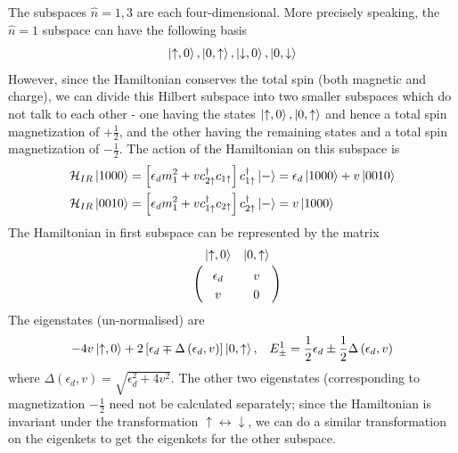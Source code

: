 \documentclass[12pt,twoside]{report}
\numberwithin{equation}{section}
\begin{document}
\pb The subspaces \(\hat n = 1,3\) are each four-dimensional. More precisely speaking, the \(\hat n=1\) subspace can have the following basis
\begin{equation}\begin{aligned}
	\ket{\uparrow,0}, \ket{0,\uparrow}, \ket{\downarrow,0}, \ket{0,\downarrow}
\end{aligned}\end{equation}
However, since the Hamiltonian conserves the total spin (both magnetic and charge), we can divide this Hilbert subspace into two smaller subspaces which do not talk to each other - one having the states \(\ket{\uparrow,0}, \ket{0,\uparrow}\) and hence a total spin magnetization of \(+\frac{1}{2}\), and the other having the remaining states and a total spin magnetization of \(-\frac{1}{2}\). The action of the Hamiltonian on this subspace is
\begin{equation}\begin{aligned}
	\mathcal{H}_{IR} \ket{1000} &= \left[\epsilon_d m_1^2 + vc^\dagger_{2 \uparrow}c_{1 \uparrow}\right] c^\dagger_{1 \uparrow}\ket{-} = \epsilon_d\ket{1000} + v\ket{0010}\\
	\mathcal{H}_{IR} \ket{0010} &= \left[\epsilon_d m_1^2 + vc^\dagger_{1 \uparrow}c_{2 \uparrow}\right] c^\dagger_{2 \uparrow}\ket{-} = v\ket{1000}\\
\end{aligned}\end{equation}
The Hamiltonian in first subspace can be represented by the matrix
\begin{equation}\begin{aligned}
	\label{n1mat}
	\bordermatrix{~&\ket{\uparrow,0} & \ket{0,\uparrow} \\
		~&\epsilon_d & v \\
		~& v & 0 \\
	}
\end{aligned}\end{equation}
The eigenstates (un-normalised) are
\begin{equation}\begin{aligned}
\label{low}
	-4v\ket{\uparrow,0} +2 \left[ \epsilon_d \mp \Delta\left(\epsilon_d , v\right)\right] \ket{0, \uparrow}, && E^1_\pm = \frac{1}{2} \epsilon_d \pm \frac{1}{2}\Delta\left(\epsilon_d , v\right)
\end{aligned}\end{equation}
where \(\Delta\left(\epsilon_d , v\right)  = \sqrt{\epsilon_d^2 + 4 v^2}\). The other two eigenstates (corresponding to magnetization \(- \frac{1}{2}\) need not be calculated separately; since the Hamiltonian is invariant under the transformation \( \uparrow \leftrightarrow \downarrow\), we can do a similar transformation on the eigenkets to get the eigenkets for the other subspace.
\end{document}
